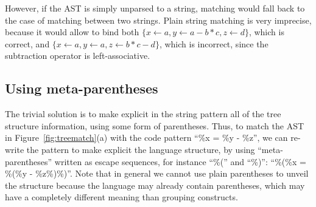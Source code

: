\documentclass{sigplanconf}
\begin{document}
However, if the AST is simply unparsed to a string, matching would
fall back to the case of matching between two strings. Plain string
matching is very imprecise, because it would allow to bind both
$\{x\gets a, y\gets a-b*c, z\gets d\}$, which is correct, and
$\{x\gets a, y\gets a, z\gets b*c-d\}$, which is incorrect, since the
subtraction operator is left-associative.

\subsection{Using meta-parentheses}

The trivial solution is to make explicit in the string pattern all of
the tree structure information, using some form of parentheses.  Thus,
to match the AST in Figure~\ref{fig:treematch}(a) with the code
pattern ``\%x = \%y - \%z'', we can re-write the pattern to make
explicit the language structure, by using ``meta-parentheses'' written
as escape sequences, for instance ``\%('' and ``\%)'': ``\%(\%x =
\%(\%y - \%z\%)\%)''. Note that in general we cannot use plain
parentheses to unveil the structure because the language may already
contain parentheses, which may have a completely different meaning
than grouping constructs. 


\end{document}
